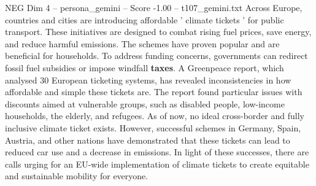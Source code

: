 \begin{textsample}{NEG Dim 4 – persona\_gemini – Score -1.00 – t107\_gemini.txt}  \label{ex:f4_neg_012}
Across Europe, countries and cities are introducing affordable ' climate tickets ' for public transport.
These initiatives are designed to combat rising fuel prices, save energy, and reduce harmful emissions.
The schemes have proven popular and are beneficial for households.
To address funding concerns, governments can redirect fossil fuel subsidies or impose windfall \textbf{taxes}.
A Greenpeace report, which analysed 30 European ticketing systems, has revealed inconsistencies in how affordable and simple these tickets are.
The report found particular issues with discounts aimed at vulnerable groups, such as disabled people, low-income households, the elderly, and refugees.
As of now, no ideal cross-border and fully inclusive climate ticket exists.
However, successful schemes in Germany, Spain, Austria, and other nations have demonstrated that these tickets can lead to reduced car use and a decrease in emissions.
In light of these successes, there are calls urging for an EU-wide implementation of climate tickets to create equitable and sustainable mobility for everyone.

\end{textsample}
